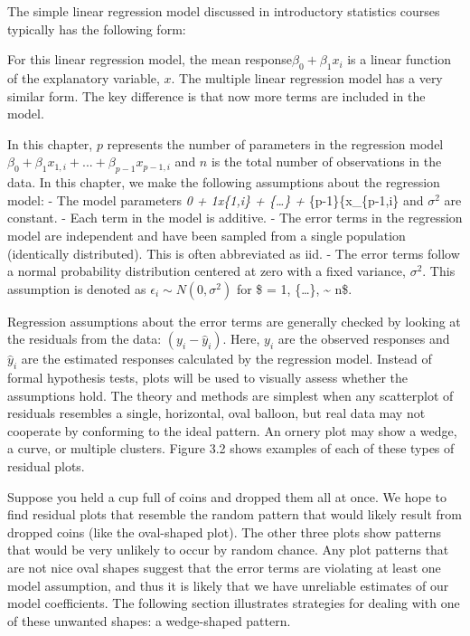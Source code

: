 \documentclass[
]{report}
\theoremstyle{definition}
\theoremstyle{definition}
\theoremstyle{definition}
\theoremstyle{definition}
\theoremstyle{remark}
\begin{document}
The simple linear regression model discussed in introductory statistics courses typically has the following form:

For this linear regression model, the mean response\(\beta_0 + \beta_1x_i\) is a linear function of the explanatory variable, \(x\). The multiple linear regression model has a very similar form. The key difference is that now more terms are included in the model.

In this chapter, \(p\) represents the number of parameters in the regression model \(\beta_0 + \beta_1x_{1,i} + {...} + \beta_{p-1}x_{p-1,i}\) and \(n\) is the total number of observations in the data. In this chapter, we make the following assumptions
about the regression model:
- The model parameters \beta\emph{0 + \beta\emph{1x}\{1,i\} + \{\ldots\} + \beta}\{p-1\}\{x\_\{p-1,i\} and \(\sigma^2\) are constant.
- Each term in the model is additive.
- The error terms in the regression model are independent and have been sampled from a single population (identically distributed). This is often abbreviated as iid.
- The error terms follow a normal probability distribution centered at zero with a fixed variance, \(\sigma^2\). This assumption is denoted as \(\epsilon_i \sim N(0,\sigma^2)\) for \$ = 1, \{\ldots\}, \textasciitilde{} n\$.

Regression assumptions about the error terms are generally checked by looking at the residuals from the data: \(({y}_i - \hat{y}_i)\). Here, \(y_i\) are the observed responses and \(\hat{y}_i\) are the estimated responses calculated by the regression model. Instead of formal hypothesis tests, plots will be used to visually assess whether the assumptions hold. The theory and methods are simplest when any scatterplot of residuals resembles a
single, horizontal, oval balloon, but real data may not cooperate by conforming to the ideal pattern. An ornery plot may show a wedge, a curve, or multiple clusters. Figure 3.2 shows examples of each of these types of residual plots.

Suppose you held a cup full of coins and dropped them all at once. We hope to find residual plots that resemble the random pattern that would likely result from dropped coins (like the oval-shaped plot). The other three plots show patterns that would be very unlikely to occur by random chance. Any plot patterns that are not nice oval shapes suggest that the error terms are violating at least one model assumption, and thus it is
likely that we have unreliable estimates of our model coefficients. The following section illustrates strategies for dealing with one of these unwanted shapes: a wedge-shaped pattern.
\end{document}
